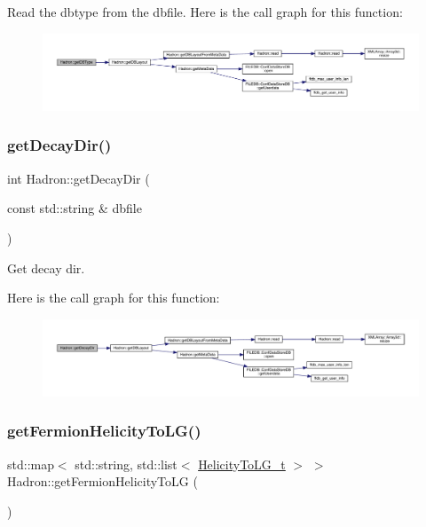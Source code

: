 Read the dbtype from the dbfile. Here is the call graph for this function\+:
\nopagebreak
\begin{figure}[H]
\begin{center}
\leavevmode
\includegraphics[width=350pt]{d1/daf/namespaceHadron_a82284ec1545a1a6b6794da8d973a1d57_cgraph}
\end{center}
\end{figure}
\mbox{\label{namespaceHadron_ae5c5e7cd57aa116ce56262bf00762610}} 
\subsubsection{\texorpdfstring{getDecayDir()}{getDecayDir()}}
{\footnotesize\ttfamily int Hadron\+::get\+Decay\+Dir (\begin{DoxyParamCaption}\item[{const std\+::string \&}]{dbfile }\end{DoxyParamCaption})}



Get decay dir. 

Here is the call graph for this function\+:
\nopagebreak
\begin{figure}[H]
\begin{center}
\leavevmode
\includegraphics[width=350pt]{d1/daf/namespaceHadron_ae5c5e7cd57aa116ce56262bf00762610_cgraph}
\end{center}
\end{figure}
\mbox{\label{namespaceHadron_af7b75d50b2ca47d90a4d42ff7152bf4d}} 
\subsubsection{\texorpdfstring{getFermionHelicityToLG()}{getFermionHelicityToLG()}}
{\footnotesize\ttfamily std\+::map$<$ std\+::string, std\+::list$<$ \mbox{\hyperlink{structHadron_1_1HelicityToLG__t}{Helicity\+To\+L\+G\+\_\+t}} $>$ $>$ Hadron\+::get\+Fermion\+Helicity\+To\+LG (\begin{DoxyParamCaption}{ }\end{DoxyParamCaption})}



